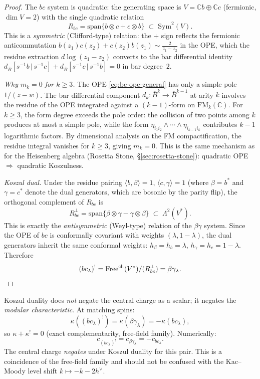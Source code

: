 \documentclass[11pt]{article}
\newcommand{\barB}{\overline{B}}
\newcommand{\C}{\mathbb{C}}
\newcommand{\FM}{\mathrm{FM}}
\begin{document}
\begin{proof}
The $bc$ system is quadratic: the generating space is
$V = \C b \oplus \C c$ (fermionic, $\dim V = 2$) with
the single quadratic relation
\[
R_{bc} = \mathrm{span}\{b \otimes c + c \otimes b\}
\;\subset\; \mathrm{Sym}^2(V).
\]
This is a \emph{symmetric} (Clifford-type) relation: the
$+$ sign reflects the fermionic anticommutation $b(z_1)c(z_2)
+ c(z_2)b(z_1) \sim \frac{2}{z_1 - z_2}$ in the OPE, which
the residue extraction $d\log(z_1 - z_2)$ converts to the
bar differential identity $d_{\barB}[s^{-1}b \,|\, s^{-1}c]
+ d_{\barB}[s^{-1}c \,|\, s^{-1}b] = 0$ in bar degree~$2$.

\emph{Why $m_k = 0$ for $k \ge 3$.}  The OPE \eqref{eq:bc-ope-general}
has only a simple pole $1/(z{-}w)$.  The bar differential component
$d_k\colon \barB^k \to \barB^{k-1}$ at arity $k$ involves the
residue of the OPE integrated against a $(k{-}1)$-form on
$\FM_k(\C)$.  For $k \ge 3$, the form degree exceeds the pole
order: the collision of two points among $k$ produces at most a
simple pole, while the form $\eta_{i_1 i_2} \wedge \cdots \wedge
\eta_{i_{k-1} i_k}$ contributes $k{-}1$ logarithmic factors.
By dimensional analysis on the FM compactification, the residue
integral vanishes for $k \ge 3$, giving $m_k = 0$.  This is the
same mechanism as for the Heisenberg algebra (Rosetta Stone,
\S\ref{sec:rosetta-stone}): quadratic OPE $\Rightarrow$
quadratic Koszulness.

\emph{Koszul dual.}
Under the residue pairing $\langle b, \beta \rangle = 1$,
$\langle c, \gamma \rangle = 1$ (where $\beta = b^*$ and
$\gamma = c^*$ denote the dual generators, which are bosonic
by the parity flip), the orthogonal complement of $R_{bc}$ is
\[
R_{bc}^\perp = \mathrm{span}\{\beta \otimes \gamma - \gamma
\otimes \beta\} \;\subset\; \Lambda^2(V^*).
\]
This is exactly the \emph{antisymmetric} (Weyl-type) relation
of the $\beta\gamma$ system.  Since the OPE of $bc$ is
conformally covariant with weights $(\lambda, 1{-}\lambda)$,
the dual generators inherit the same conformal weights: $h_\beta
= h_b = \lambda$, $h_\gamma = h_c = 1 - \lambda$.  Therefore
\[
(bc_\lambda)^!
= \mathrm{Free}^{\mathrm{ch}}(V^*)/(R_{bc}^\perp)
= \beta\gamma_\lambda.
\qedhere
\]
\end{proof}

\begin{remark}
\label{rem:bc-kappa-koszul}
Koszul duality does \emph{not} negate the central charge
as a scalar; it negates the \emph{modular characteristic}.
At matching spins:
\[
\kappa((bc_\lambda)^!) = \kappa(\beta\gamma_\lambda)
= -\kappa(bc_\lambda),
\]
so $\kappa + \kappa^! = 0$ (exact complementarity, free-field
family).  Numerically:
\[
c_{(bc_\lambda)^!} = c_{\beta\gamma_\lambda}
= -c_{bc_\lambda}.
\]
The central charge \emph{negates} under Koszul duality for
this pair.  This is a coincidence of the free-field family
and should not be confused with the Kac--Moody level shift
$k \mapsto -k - 2h^\vee$.
\end{remark}
\end{document}
